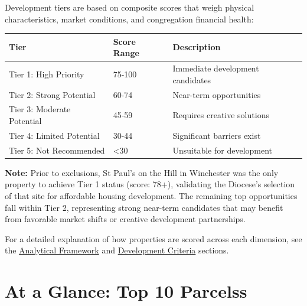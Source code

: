 \documentclass[
  letterpaper,
  DIV=11,
  numbers=noendperiod,
  oneside]{scrreprt}
\begin{document}
\begin{tcolorbox}[enhanced jigsaw, bottomtitle=1mm, left=2mm, rightrule=.15mm, colbacktitle=quarto-callout-note-color!10!white, arc=.35mm, title=\textcolor{quarto-callout-note-color}{\faInfo}\hspace{0.5em}{Understanding Development Tiers}, bottomrule=.15mm, colback=white, colframe=quarto-callout-note-color-frame, leftrule=.75mm, titlerule=0mm, opacitybacktitle=0.6, breakable, coltitle=black, toptitle=1mm, toprule=.15mm, opacityback=0]

Development tiers are based on composite scores that weigh physical
characteristics, market conditions, and congregation financial health:

\begin{longtable}[]{@{}lll@{}}
\toprule\noalign{}
Tier & Score Range & Description \\
\midrule\noalign{}
\endhead
\bottomrule\noalign{}
\endlastfoot
Tier 1: High Priority & 75-100 & Immediate development candidates \\
Tier 2: Strong Potential & 60-74 & Near-term opportunities \\
Tier 3: Moderate Potential & 45-59 & Requires creative solutions \\
Tier 4: Limited Potential & 30-44 & Significant barriers exist \\
Tier 5: Not Recommended & \textless30 & Unsuitable for development \\
\end{longtable}

\textbf{Note:} Prior to exclusions, St Paul's on the Hill in Winchester
was the only property to achieve Tier 1 status (score: 78+), validating
the Diocese's selection of that site for affordable housing development.
The remaining top opportunities fall within Tier 2, representing strong
near-term candidates that may benefit from favorable market shifts or
creative development partnerships.

For a detailed explanation of how properties are scored across each
dimension, see the \href{analytical-framework.qmd}{Analytical Framework}
and \href{development-criteria.qmd}{Development Criteria} sections.

\end{tcolorbox}

\section*{At a Glance: Top 10
Parcelss}\label{at-a-glance-top-10-parcelss}
\end{document}
